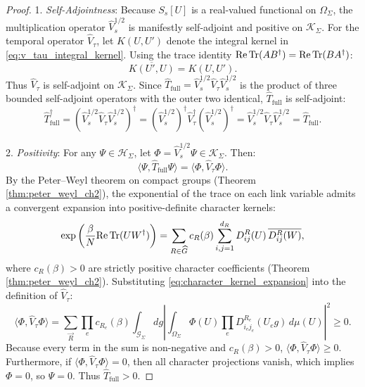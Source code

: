 \begin{proof}
1. \emph{Self-Adjointness}: Because $S_s[U]$ is a real-valued functional on $\Omega_\Sigma$, the multiplication operator $\hat{V}_s^{1/2}$ is manifestly self-adjoint and positive on $\mathcal{K}_\Sigma$. 
For the temporal operator $\hat{V}_\tau$, let $K(U, U')$ denote the integral kernel in \eqref{eq:v_tau_integral_kernel}. Using the trace identity $\mathrm{Re} \, \mathrm{Tr}(A B^\dagger) = \mathrm{Re} \, \mathrm{Tr}(B A^\dagger)$:
\begin{equation}
\overline{K(U', U)} = K(U, U').
\end{equation}
Thus $\hat{V}_\tau$ is self-adjoint on $\mathcal{K}_\Sigma$. Since $\hat{T}_{\mathrm{full}} = \hat{V}_s^{1/2} \hat{V}_\tau \hat{V}_s^{1/2}$ is the product of three bounded self-adjoint operators with the outer two identical, $\hat{T}_{\mathrm{full}}$ is self-adjoint:
\begin{equation}
\hat{T}_{\mathrm{full}}^\dagger = (\hat{V}_s^{1/2} \hat{V}_\tau \hat{V}_s^{1/2})^\dagger = (\hat{V}_s^{1/2})^\dagger \hat{V}_\tau^\dagger (\hat{V}_s^{1/2})^\dagger = \hat{V}_s^{1/2} \hat{V}_\tau \hat{V}_s^{1/2} = \hat{T}_{\mathrm{full}}.
\end{equation}

2. \emph{Positivity}: For any $\Psi \in \mathcal{H}_\Sigma$, let $\Phi = \hat{V}_s^{1/2} \Psi \in \mathcal{K}_\Sigma$. Then:
\begin{equation}
\langle \Psi, \hat{T}_{\mathrm{full}} \Psi \rangle = \langle \Phi, \hat{V}_\tau \Phi \rangle.
\end{equation}
By the Peter--Weyl theorem on compact groups (Theorem \ref{thm:peter_weyl_ch2}), the exponential of the trace on each link variable admits a convergent expansion into positive-definite character kernels:
\begin{equation}
\label{eq:character_kernel_expansion}
\exp\left( \frac{\beta}{N} \mathrm{Re} \, \mathrm{Tr}(U W^\dagger) \right) = \sum_{R \in \widehat{G}} c_R(\beta) \sum_{i, j=1}^{d_R} D_{ij}^R(U) \, \overline{D_{ij}^R(W)},
\end{equation}
where $c_R(\beta) > 0$ are strictly positive character coefficients (Theorem \ref{thm:peter_weyl_ch2}). Substituting \eqref{eq:character_kernel_expansion} into the definition of $\hat{V}_\tau$:
\begin{equation}
\langle \Phi, \hat{V}_\tau \Phi \rangle = \sum_{\vec{R}} \prod_e c_{R_e}(\beta) \int_{\mathcal{G}_\Sigma} dg \left| \int_{\Omega_\Sigma} \Phi(U) \prod_e D_{i_e j_e}^{R_e}(U_e g) \, d\mu(U) \right|^2 \ge 0.
\end{equation}
Because every term in the sum is non-negative and $c_R(\beta) > 0$, $\langle \Phi, \hat{V}_\tau \Phi \rangle \ge 0$. Furthermore, if $\langle \Phi, \hat{V}_\tau \Phi \rangle = 0$, then all character projections vanish, which implies $\Phi = 0$, so $\Psi = 0$. Thus $\hat{T}_{\mathrm{full}} > 0$.


\end{proof}
